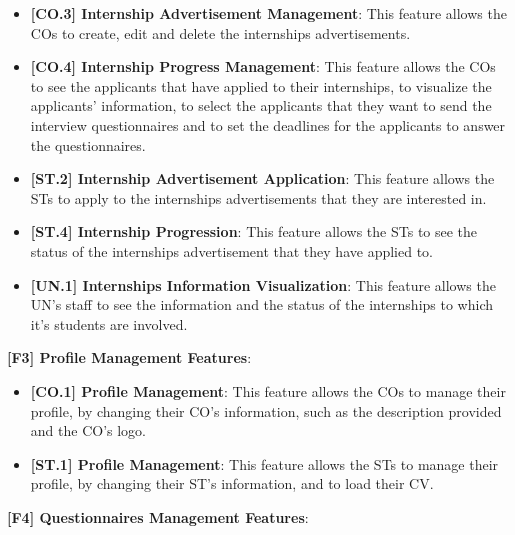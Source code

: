 \begin{itemize}
    \item \textbf{[CO.3] Internship Advertisement Management}: This feature allows the COs to create, edit and delete
          the internships advertisements.
    \item \textbf{[CO.4] Internship Progress Management}: This feature allows the COs to see the applicants that have
          applied to their internships, to visualize the applicants' information, to select the applicants that they want to
          send the interview questionnaires and to set the deadlines for the applicants to answer the questionnaires.
    \item \textbf{[ST.2] Internship Advertisement Application}: This feature allows the STs to apply to the internships
          advertisements that they are interested in.
    \item \textbf{[ST.4] Internship Progression}: This feature allows the STs to see the status of the internships
          advertisement that they have applied to.
    \item \textbf{[UN.1] Internships Information Visualization}: This feature allows the UN's staff to see the
          information and the status of the internships to which it's students are involved.
\end{itemize}


\par \textbf{[F3] Profile Management Features}:

\begin{itemize}
    \item \textbf{[CO.1] Profile Management}: This feature allows the COs to manage their profile, by changing their
          CO's information, such as the description provided and the CO's logo.
    \item \textbf{[ST.1] Profile Management}: This feature allows the STs to manage their profile, by changing their
          ST's information, and to load their CV.
\end{itemize}

\par \textbf{[F4] Questionnaires Management Features}:


